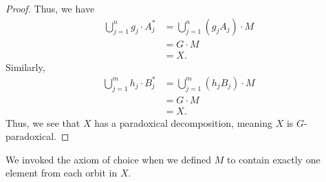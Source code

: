 \documentclass[10pt]{mypackage}
\begin{document}
\begin{proof}
  Thus, we have
  \begin{align*}
    \bigcup_{j=1}^{n}g_j\cdot A_j^{\ast} &= \bigcup_{j=1}^{n} \left(g_jA_j\right)\cdot M\\
                                         &= G\cdot M\\
                                         &= X.
  \end{align*}
  Similarly,
  \begin{align*}
    \bigcup_{j=1}^{m}h_j\cdot B_j^{\ast} &= \bigcup_{j=1}^{m}\left(h_jB_j\right)\cdot M\\
                                         &= G\cdot M\\
                                         &= X.
  \end{align*}
  Thus, we see that $X$ has a paradoxical decomposition, meaning $X$ is $G$-paradoxical.
\end{proof}
\begin{note}
  We invoked the axiom of choice when we defined $M$ to contain exactly one element from each orbit in $X$.
\end{note}
\end{document}
